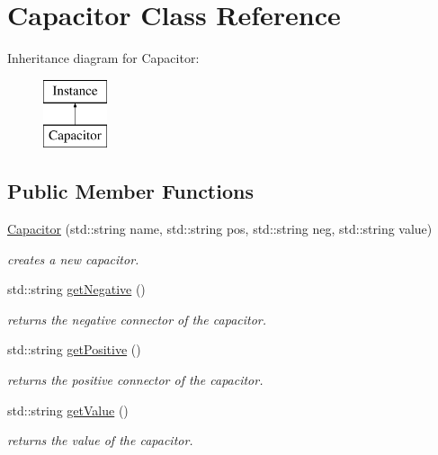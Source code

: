 \hypertarget{class_s_p_i_c_e_1_1_capacitor}{}\section{Capacitor Class Reference}
\label{class_s_p_i_c_e_1_1_capacitor}
Inheritance diagram for Capacitor\+:\begin{figure}[H]
\begin{center}
\leavevmode
\includegraphics[height=2.000000cm]{class_s_p_i_c_e_1_1_capacitor}
\end{center}
\end{figure}
\subsection*{Public Member Functions}
\begin{DoxyCompactItemize}
\item 
\mbox{\hyperlink{class_s_p_i_c_e_1_1_capacitor_af3141143353c1a45fb2f2f35d3ddd28d}{Capacitor}} (std\+::string name, std\+::string pos, std\+::string neg, std\+::string value)
\begin{DoxyCompactList}\small\item\em creates a new capacitor. \end{DoxyCompactList}\item 
\mbox{\label{class_s_p_i_c_e_1_1_capacitor_a8b4ab73ed1d99c533aa22af0a37ebb0d}} 
std\+::string \mbox{\hyperlink{class_s_p_i_c_e_1_1_capacitor_a8b4ab73ed1d99c533aa22af0a37ebb0d}{get\+Negative}} ()
\begin{DoxyCompactList}\small\item\em returns the negative connector of the capacitor. \end{DoxyCompactList}\item 
\mbox{\label{class_s_p_i_c_e_1_1_capacitor_a1adb347b9a2c2da556e4417ab0eec0e1}} 
std\+::string \mbox{\hyperlink{class_s_p_i_c_e_1_1_capacitor_a1adb347b9a2c2da556e4417ab0eec0e1}{get\+Positive}} ()
\begin{DoxyCompactList}\small\item\em returns the positive connector of the capacitor. \end{DoxyCompactList}\item 
\mbox{\label{class_s_p_i_c_e_1_1_capacitor_a4c052cb2622c580a250b2c783a436882}} 
std\+::string \mbox{\hyperlink{class_s_p_i_c_e_1_1_capacitor_a4c052cb2622c580a250b2c783a436882}{get\+Value}} ()
\begin{DoxyCompactList}\small\item\em returns the value of the capacitor. \end{DoxyCompactList}\end{DoxyCompactItemize}


